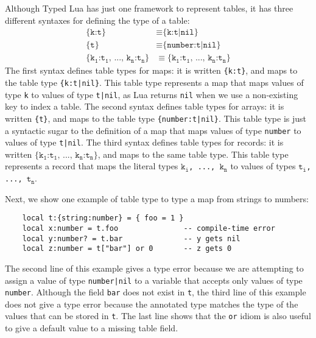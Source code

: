 Although Typed Lua has just one framework to represent tables,
it has three different syntaxes for defining the type of a table:
\begin{align}
\label{syn:table1}
\texttt{\{k:t\}} & \equiv \texttt{\{k:t|nil\}}\\
\label{syn:table2}
\texttt{\{t\}} & \equiv \texttt{\{number:t|nil\}}\\
\label{syn:table3}
\texttt{\{k}{_\texttt{1}}\texttt{:t}_{\texttt{1}}
\texttt{, ..., k}{_\texttt{n}}\texttt{:t}_{\texttt{n}}\texttt{\}} & \equiv
\texttt{\{k}{_\texttt{1}}\texttt{:t}_{\texttt{1}}
\texttt{, ..., k}{_\texttt{n}}\texttt{:t}_{\texttt{n}}\texttt{\}}
\end{align}
The first syntax defines table types for maps:
it is written \texttt{\{k:t\}},
and maps to the table type \texttt{\{k:t|nil\}}.
This table type represents a map that maps values of type
\texttt{k} to values of type \texttt{t|nil},
as Lua returns \texttt{nil} when we use a non-existing key to index a table.
The second syntax defines table types for arrays:
it is written \texttt{\{t\}},
and maps to the table type \texttt{\{number:t|nil\}}.
This table type is just a syntactic sugar to the definition of a
map that maps values of type \texttt{number} to values of type \texttt{t|nil}.
The third syntax defines table types for records: it is written
$\texttt{\{k}{_\texttt{1}}\texttt{:t}_{\texttt{1}}
\texttt{, ..., k}{_\texttt{n}}\texttt{:t}_{\texttt{n}}\texttt{\}}$,
and maps to the same table type.
This table type represents a record that maps the literal types
$\texttt{k}_{\texttt{i}}$\texttt{, ..., }$\texttt{k}_{\texttt{n}}$
to values of types $\texttt{t}_{\texttt{i}}$\texttt{, ..., }$\texttt{t}_{\texttt{n}}$.

Next, we show one example of table type to type a map from strings to numbers:
\begin{verbatim}
    local t:{string:number} = { foo = 1 } 
    local x:number = t.foo               -- compile-time error
    local y:number? = t.bar              -- y gets nil
    local z:number = t["bar"] or 0       -- z gets 0 
\end{verbatim}

The second line of this example gives a type error because we are
attempting to assign a value of type \texttt{number|nil} to a
variable that accepts only values of type \texttt{number}.
Although the field \texttt{bar} does not exist in \texttt{t}, the third
line of this example does not give a type error because the
annotated type matches the type of the values that can be stored in
\texttt{t}.
The last line shows that the \texttt{or} idiom is also useful to
give a default value to a missing table field.

